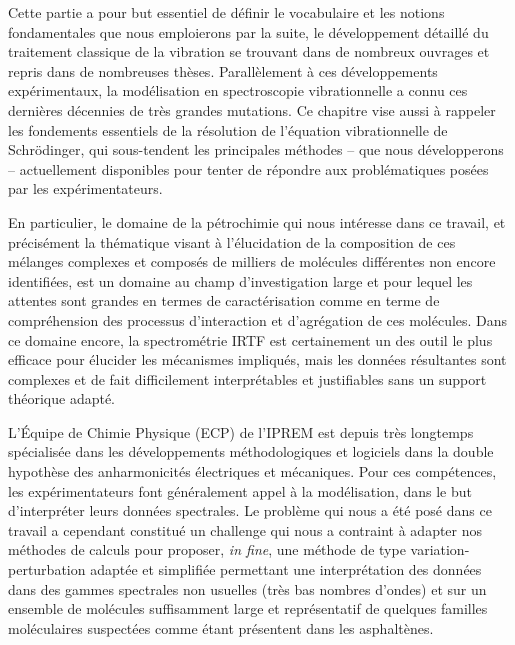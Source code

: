 Cette partie a pour but essentiel de définir le vocabulaire et les notions fondamentales que nous emploierons par la suite, le développement détaillé du traitement classique de la vibration se trouvant dans de nombreux ouvrages  et repris dans de nombreuses thèses. Parallèlement à ces développements expérimentaux, la modélisation en spectroscopie vibrationnelle a connu ces dernières décennies de très grandes mutations. Ce chapitre vise aussi à rappeler les fondements essentiels de la résolution de l'équation vibrationnelle de Schr\"{o}dinger, qui sous-tendent les principales méthodes -- que nous développerons -- actuellement disponibles pour tenter de répondre aux problématiques posées par les expérimentateurs. 


En particulier, le domaine de la pétrochimie qui nous intéresse dans ce travail, et précisément la thématique visant à l'élucidation de la composition de ces mélanges complexes et composés de milliers de molécules différentes non encore identifiées, est un domaine au champ d'investigation large et pour lequel les attentes sont grandes en termes de caractérisation comme en terme de compréhension des processus d’interaction et d’agrégation de ces molécules. Dans ce domaine encore, la spectrométrie IRTF est certainement un des outil le plus efficace pour élucider les mécanismes impliqués, mais les données résultantes sont complexes et de fait difficilement interprétables et justifiables sans un support théorique adapté.

L'Équipe de Chimie Physique (ECP) de l'IPREM est depuis très longtemps spécialisée dans les développements méthodologiques et logiciels dans la double hypothèse des anharmonicités électriques et mécaniques. Pour ces compétences, les expérimentateurs  font généralement appel à la modélisation, dans le but d'interpréter leurs données spectrales.
Le problème qui nous a été posé dans ce travail a cependant constitué un challenge qui nous a contraint à adapter nos méthodes de calculs pour proposer, \textit{in fine}, une méthode de type variation-perturbation adaptée et simplifiée permettant une interprétation des données dans des gammes spectrales non usuelles (très bas nombres d’ondes) et sur un ensemble de molécules suffisamment large et représentatif de quelques familles moléculaires suspectées comme étant présentent dans les asphaltènes. 


\newpage

